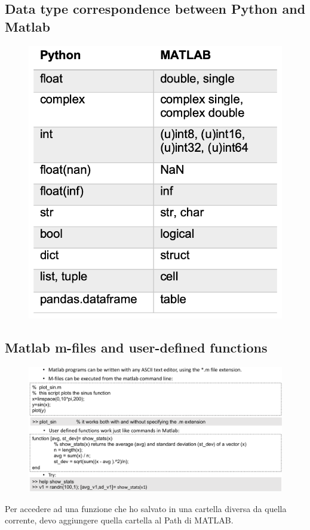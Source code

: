 \subsection{Data type correspondence between Python and Matlab}

\begin{figure}[ht]
	\centering
	\includegraphics[width=0.5\linewidth]{figure_med/datatype_matlab}
\end{figure}
\FloatBarrier

\newpage
\subsection{Matlab m-files and user-defined functions}

\begin{figure}[ht]
	\centering
	\includegraphics[width=1\linewidth]{figure_med/m-files}
\end{figure}
\FloatBarrier

Per accedere ad una funzione che ho salvato in una cartella diversa da quella corrente, devo aggiungere quella cartella al Path di MATLAB.

